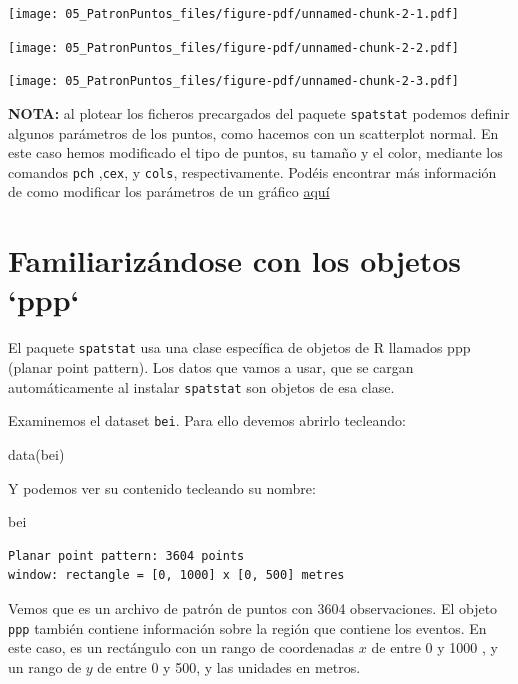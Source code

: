 \documentclass[
  letterpaper,
  DIV=11,
  numbers=noendperiod]{scrreprt}
\newenvironment{Shaded}{\begin{snugshade}}{\end{snugshade}}
\newcommand{\FunctionTok}[1]{\textcolor[rgb]{0.28,0.35,0.67}{#1}}
\newcommand{\NormalTok}[1]{\textcolor[rgb]{0.00,0.23,0.31}{#1}}
\begin{document}
\texttt{[image: 05\_PatronPuntos\_files/figure-pdf/unnamed-chunk-2-1.pdf]}

\texttt{[image: 05\_PatronPuntos\_files/figure-pdf/unnamed-chunk-2-2.pdf]}

\texttt{[image: 05\_PatronPuntos\_files/figure-pdf/unnamed-chunk-2-3.pdf]}

\textbf{NOTA:} al plotear los ficheros precargados del paquete
\texttt{spatstat} podemos definir algunos parámetros de los puntos, como
hacemos con un scatterplot normal. En este caso hemos modificado el tipo
de puntos, su tamaño y el color, mediante los comandos \texttt{pch}
,\texttt{cex}, y \texttt{cols}, respectivamente. Podéis encontrar más
información de como modificar los parámetros de un gráfico
\href{https://www.statmethods.net/advgraphs/parameters.html}{aquí}

\hypertarget{familiarizuxe1ndose-con-los-objetos-ppp}{%
\section{Familiarizándose con los objetos
`ppp`}\label{familiarizuxe1ndose-con-los-objetos-ppp}}

El paquete \texttt{spatstat} usa una clase específica de objetos de R
llamados ppp (planar point pattern). Los datos que vamos a usar, que se
cargan automáticamente al instalar \texttt{spatstat} son objetos de esa
clase.

Examinemos el dataset \texttt{bei}. Para ello devemos abrirlo tecleando:

\begin{Shaded}
\begin{Highlighting}[]
\FunctionTok{data}\NormalTok{(bei)}
\end{Highlighting}
\end{Shaded}

Y podemos ver su contenido tecleando su nombre:

\begin{Shaded}
\begin{Highlighting}[]
\NormalTok{bei}
\end{Highlighting}
\end{Shaded}

\begin{verbatim}
Planar point pattern: 3604 points
window: rectangle = [0, 1000] x [0, 500] metres
\end{verbatim}

Vemos que es un archivo de patrón de puntos con 3604 observaciones. El
objeto \texttt{ppp} también contiene información sobre la región que
contiene los eventos. En este caso, es un rectángulo con un rango de
coordenadas \(x\) de entre 0 y 1000 , y un rango de \(y\) de entre 0 y
500, y las unidades en metros.
\end{document}
